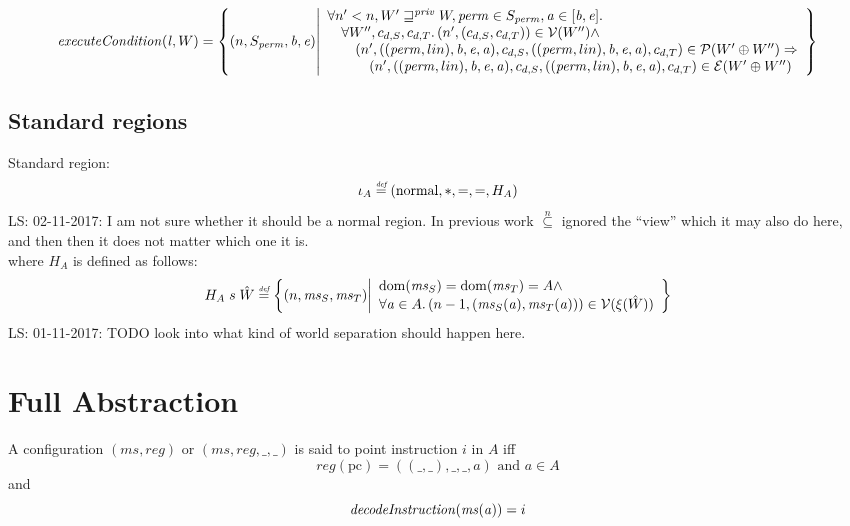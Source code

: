 \documentclass[a3paper]{article}
\newcommand\lau[1]{{\color{purple} \sf \footnotesize {LS: #1}}\\}
\newcommand{\defeq}{\stackrel{\textit{\tiny{def}}}{=}}
\newcommand{\dom}{\mathrm{dom}}
\newcommand{\npair}[2][n]{\left(#1,#2\right)}
\newcommand{\nsubeq}[1][n]{\overset{#1}{\subseteq}}
\newcommand{\tand}{\text{ and }}
\newcommand{\typesetlr}[1]{\mathcal{#1}}
\newcommand{\lre}{\typesetlr{E}}
\newcommand{\lrv}{\typesetlr{V}}
\newcommand{\lrp}{\typesetlr{P}}
\newcommand{\future}{\sqsupseteq}
\newcommand{\privft}{\future^{\priv}}
\newcommand{\sourcecolor}{\color{blue}}
\newcommand{\perm}{\var{perm}}
\newcommand{\lin}{\var{l}}
\newcommand{\var}[1]{\mathit{#1}}
\newcommand{\reg}{\var{reg}}
\newcommand{\ms}{\var{ms}}
\newcommand{\priv}{\var{priv}}
\newcommand{\baddr}{\var{b}}
\newcommand{\eaddr}{\var{e}}
\newcommand{\aaddr}{\var{a}}
\newcommand{\pcreg}{\mathrm{pc}}
\newcommand{\plainlinearity}[1]{\mathrm{#1}}
\newcommand{\normal}{\plainlinearity{normal}}
\newcommand{\plainfun}[2]{
  \ifthenelse{\equal{#2}{}}
  {\mathit{#1}}
  {\mathit{#1}(#2)}
}
\newcommand{\decInstr}[1]{\plainfun{decodeInstruction}{#1}}
\newcommand{\execCond}[1]{\plainfun{executeCondition}{#1}}
\begin{document}
\[
  \execCond{\lin,W} = \left\{ \npair{S_\perm,\baddr,\eaddr} \middle|
    \begin{array}{l}
      \forall n' < n, W' \privft W, \perm \in S_\perm, \aaddr \in [\baddr,\eaddr] \ldotp\\
      \quad \forall W'', c_{d,S},c_{d,T} \ldotp \npair[n']{(c_{d,S},c_{d,T})} \in \lrv(W'') \wedge \\
      \qquad \npair[n']{((\perm,lin),\baddr,\eaddr,\aaddr),c_{d,S},((\perm,lin),\baddr,\eaddr,\aaddr),c_{d,T}} \in \lrp(W' \oplus W'') \Rightarrow \\
      \quad \qquad \npair[n']{((\perm,lin),\baddr,\eaddr,\aaddr),c_{d,S},((\perm,lin),\baddr,\eaddr,\aaddr),c_{d,T}} \in \lre(W' \oplus W'')
    \end{array}
    \right\}
\]


\subsection{Standard regions}
\label{sec:standard-regions}
Standard region:
\[
  \iota_A \defeq (\normal,*,=,=,H_A)
\]
\lau{02-11-2017: I am not sure whether it should be a $\normal$ region. In previous work $\nsubeq$ ignored the ``view'' which it may also do here, and then then it does not matter which one it is.}
where $H_A$ is defined as follows:
\[
  H_A \; s \; \hat{W} \defeq \left\{ \npair{\ms_S,\ms_T} \middle|
    \begin{array}{l}
      \dom(\ms_S) = \dom(\ms_T) = A \wedge \\
      \forall \aaddr \in A \ldotp \npair[n-1]{(\ms_S(\aaddr),\ms_T(\aaddr))} \in \lrv(\xi(\hat{W}))
    \end{array}
  \right\}
\]
\lau{01-11-2017: TODO look into what kind of world separation should happen here.}

\section{Full Abstraction}
\begin{definition}
  \label{def:points-to-instr}
  A configuration $(\ms,\reg)$ {\sourcecolor or $(\ms,\reg,\_,\_)$} is said to point instruction $i$ in $A$ iff
  \[
    \reg(\pcreg) = ((\_,\_),\_,\_,\aaddr) \tand \aaddr \in A
  \]
and
\[
  \decInstr{\ms(\aaddr)} = i
\]
\end{definition}
\end{document}
